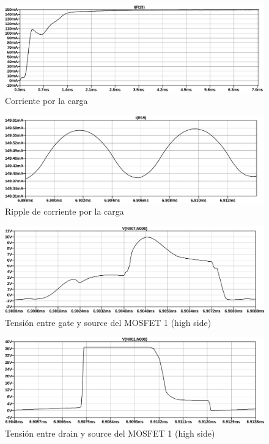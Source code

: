 \begin{figure}[ht]
    \centering
    \includegraphics[width=\textwidth]{images/sim/14.pdf}
    \caption{Corriente por la carga}
    \label{fig:sim:14}
\end{figure}

\begin{figure}[ht]
    \centering
    \includegraphics[width=\textwidth]{images/sim/14-ripple.pdf}
    \caption{Ripple de corriente por la carga}
    \label{fig:sim:14ripple}
\end{figure}

\begin{figure}[ht]
    \centering
    \includegraphics[width=\textwidth]{images/sim/15.pdf}
    \caption{Tensión entre gate y source del MOSFET 1 (high side)}
    \label{fig:sim:15}
\end{figure}

\begin{figure}[ht]
    \centering
    \includegraphics[width=\textwidth]{images/sim/16.pdf}
    \caption{Tensión entre drain y source del MOSFET 1 (high side)}
    \label{fig:sim:16}
\end{figure}

